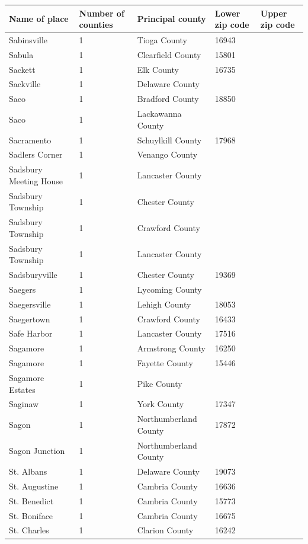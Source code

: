 \documentclass{article}
\begin{document}
\begin{tabular}{lllll}
\toprule
Name of place & Number of counties & Principal county & Lower zip code & Upper zip code \\
\midrule
Sabinsville & 1 & Tioga County & 16943 &  \\
Sabula & 1 & Clearfield County & 15801 &  \\
Sackett & 1 & Elk County & 16735 &  \\
Sackville & 1 & Delaware County &  &  \\
Saco & 1 & Bradford County & 18850 &  \\
Saco & 1 & Lackawanna County &  &  \\
Sacramento & 1 & Schuylkill County & 17968 &  \\
Sadlers Corner & 1 & Venango County &  &  \\
Sadsbury Meeting House & 1 & Lancaster County &  &  \\
Sadsbury Township & 1 & Chester County &  &  \\
Sadsbury Township & 1 & Crawford County &  &  \\
Sadsbury Township & 1 & Lancaster County &  &  \\
Sadsburyville & 1 & Chester County & 19369 &  \\
Saegers & 1 & Lycoming County &  &  \\
Saegersville & 1 & Lehigh County & 18053 &  \\
Saegertown & 1 & Crawford County & 16433 &  \\
Safe Harbor & 1 & Lancaster County & 17516 &  \\
Sagamore & 1 & Armstrong County & 16250 &  \\
Sagamore & 1 & Fayette County & 15446 &  \\
Sagamore Estates & 1 & Pike County &  &  \\
Saginaw & 1 & York County & 17347 &  \\
Sagon & 1 & Northumberland County & 17872 &  \\
Sagon Junction & 1 & Northumberland County &  &  \\
St. Albans & 1 & Delaware County & 19073 &  \\
St. Augustine & 1 & Cambria County & 16636 &  \\
St. Benedict & 1 & Cambria County & 15773 &  \\
St. Boniface & 1 & Cambria County & 16675 &  \\
St. Charles & 1 & Clarion County & 16242 &  \\

\end{tabular}
\end{document}
